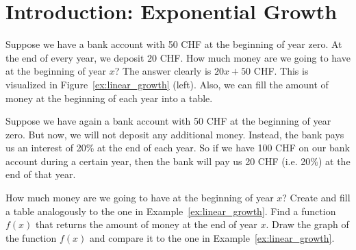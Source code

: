 \section*{Introduction: Exponential Growth}
\begin{example} \label{ex:linear_growth}
	Suppose we have a bank account with 50 CHF at the beginning of year zero.
	At the end of every year, we deposit 20 CHF.
	How much money are we going to have at the beginning of year $x$?
	The answer clearly is $20x+50$ CHF.
	This is visualized in Figure~\ref{ex:linear_growth} (left).
	Also, we can fill the amount of money at the beginning of each year into a table.
	\begin{figure}[ht]
	\centering
	\end{figure}
\end{example}
\begin{exercise} \label{ex:exponential_growth}
	Suppose we have again a bank account with 50 CHF at the beginning of year zero.
	But now, we will not deposit any additional money.
	Instead, the bank pays us an interest of 20\% at the end of each year.
	So if we have 100 CHF on our bank account during a certain year, then the bank will pay us 20 CHF (i.e. 20\%) at the end of that year.
	\begin{tasks}
		\task How much money are we going to have at the beginning of year $x$? Create and fill a table analogously to the one in Example~\ref{ex:linear_growth}.
		\task Find a function $f\left(x\right)$ that returns the amount of money at the end of year $x$.
		\task Draw the graph of the function $f\left(x\right)$ and compare it to the one in Example~\ref{ex:linear_growth}.
	\end{tasks}
\end{exercise}
